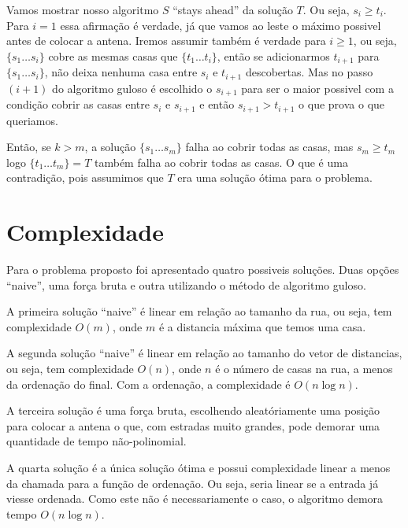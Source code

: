\documentclass[11pt]{article}
\begin{document}
Vamos mostrar nosso algoritmo $S$ ``stays ahead'' da solução $T$. Ou
seja, $s_i \geq t_i$.  Para $i = 1$ essa afirmação é verdade, já que
vamos ao leste o máximo possivel antes de colocar a antena.  Iremos
assumir também é verdade para $i \geq 1$, ou seja, $\{ s_1 \ldots s_i
\}$ cobre as mesmas casas que $\{ t_1 \ldots t_i \}$, então se
adicionarmos $t_{i+1}$ para $\{ s_1 \ldots s_i \}$, não deixa nenhuma
casa entre $s_i$ e $t_{i+1}$ descobertas.  Mas no passo $(i+1)$ do
algoritmo guloso é escolhido o $s_{i+1}$ para ser o maior possivel com
a condição cobrir as casas entre $s_i$ e $s_{i+1}$ e então $s_{i+1} >
t_{i+1}$ o que prova o que queriamos.

Então, se $k>m$, a solução $\{ s_1 \ldots s_m \}$ falha ao cobrir
todas as casas, mas $s_m \geq t_m$ logo $\{ t_1 \ldots t_m \} = T$
também falha ao cobrir todas as casas. O que é uma contradição, pois
assumimos que $T$ era uma solução ótima para o problema.


\section{Complexidade}
\label{sec-4}
\label{sec-5}

Para o problema proposto foi apresentado quatro possiveis
soluções. Duas opções ``naive'', uma força bruta e outra utilizando o
método de algoritmo guloso.

A primeira solução ``naive'' é linear em relação ao tamanho da rua, ou
seja, tem complexidade $O(m)$, onde $m$ é a distancia máxima que temos
uma casa.

A segunda solução ``naive'' é linear em relação ao tamanho do vetor de
distancias, ou seja, tem complexidade $O(n)$, onde $n$ é o número de
casas na rua, a menos da ordenação do final. Com a ordenação, a
complexidade é $O(n \log n)$.

A terceira solução é uma força bruta, escolhendo aleatóriamente uma
posição para colocar a antena o que, com estradas muito grandes, pode
demorar uma quantidade de tempo não-polinomial.

A quarta solução é a única solução ótima e possui complexidade linear
a menos da chamada para a função de ordenação. Ou seja, seria linear
se a entrada já viesse ordenada. Como este não é necessariamente o
caso, o algoritmo demora tempo $O(n\log n)$.
\end{document}

